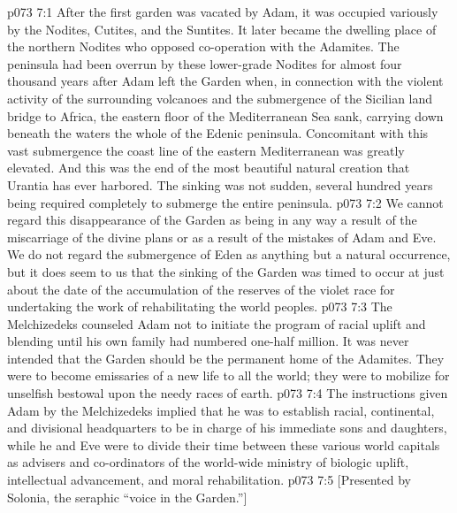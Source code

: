 \vs p073 7:1 After the first garden was vacated by Adam, it was occupied variously by the Nodites, Cutites, and the Suntites. It later became the dwelling place of the northern Nodites who opposed co\hyp{}operation with the Adamites. The peninsula had been overrun by these lower\hyp{}grade Nodites for almost four thousand years after Adam left the Garden when, in connection with the violent activity of the surrounding volcanoes and the submergence of the Sicilian land bridge to Africa, the eastern floor of the Mediterranean Sea sank, carrying down beneath the waters the whole of the Edenic peninsula. Concomitant with this vast submergence the coast line of the eastern Mediterranean was greatly elevated. And this was the end of the most beautiful natural creation that Urantia has ever harbored. The sinking was not sudden, several hundred years being required completely to submerge the entire peninsula.
\vs p073 7:2 We cannot regard this disappearance of the Garden as being in any way a result of the miscarriage of the divine plans or as a result of the mistakes of Adam and Eve. We do not regard the submergence of Eden as anything but a natural occurrence, but it does seem to us that the sinking of the Garden was timed to occur at just about the date of the accumulation of the reserves of the violet race for undertaking the work of rehabilitating the world peoples.\plusone
\pc \vs p073 7:3 The Melchizedeks counseled Adam not to initiate the program of racial uplift and blending until his own family had numbered one\hyp{}half million. It was never intended that the Garden should be the permanent home of the Adamites. They were to become emissaries of a new life to all the world; they were to mobilize for unselfish bestowal upon the needy races of earth.
\vs p073 7:4 The instructions given Adam by the Melchizedeks implied that he was to establish racial, continental, and divisional headquarters to be in charge of his immediate sons and daughters, while he and Eve were to divide their time between these various world capitals as advisers and co\hyp{}ordinators of the world\hyp{}wide ministry of biologic uplift, intellectual advancement, and moral rehabilitation.
\vsetoff
\vs p073 7:5 [Presented by Solonia, the seraphic “voice in the Garden.”]
